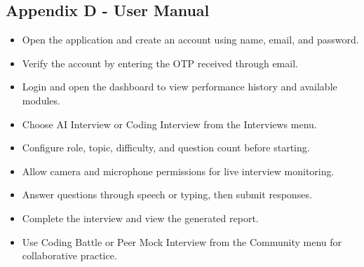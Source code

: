 \documentclass[12pt,a4paper]{report}
\begin{document}
\subsection{Appendix D - User Manual}

\begin{itemize}
\item Open the application and create an account using name, email, and password.
\end{itemize}

\begin{itemize}
\item Verify the account by entering the OTP received through email.
\end{itemize}

\begin{itemize}
\item Login and open the dashboard to view performance history and available modules.
\end{itemize}

\begin{itemize}
\item Choose AI Interview or Coding Interview from the Interviews menu.
\end{itemize}

\begin{itemize}
\item Configure role, topic, difficulty, and question count before starting.
\end{itemize}

\begin{itemize}
\item Allow camera and microphone permissions for live interview monitoring.
\end{itemize}

\begin{itemize}
\item Answer questions through speech or typing, then submit responses.
\end{itemize}

\begin{itemize}
\item Complete the interview and view the generated report.
\end{itemize}

\begin{itemize}
\item Use Coding Battle or Peer Mock Interview from the Community menu for collaborative practice.
\end{itemize}
\end{document}
